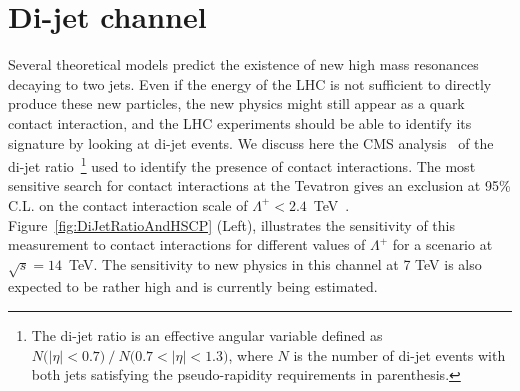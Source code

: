 \documentclass{PoS}
\begin{document}
\section{Di-jet channel} \label{dijet}
Several theoretical models predict the existence of new 
high mass resonances decaying to two jets.
Even if the energy of the LHC is not sufficient to directly produce 
these new particles, the new physics might still appear as 
a quark contact interaction,
and the LHC experiments should be able to identify its signature 
by looking at di-jet events.
We discuss here the CMS analysis~\cite{DIJETSNOTE}
of the di-jet ratio~\footnote{
The di-jet ratio is an effective angular variable
defined as $N\mbox{(}|\eta|<0.7\mbox{)}~/~N\mbox{(}0.7<|\eta|< 1.3 \mbox{)}$, 
where $N$ is the number of di-jet events with both jets satisfying the 
pseudo-rapidity requirements in parenthesis.} 
used to identify the presence of contact interactions. 
The most sensitive search for contact interactions at the Tevatron 
gives an exclusion at 95\% C.L. on the contact interaction scale 
of $\Lambda^{+} < 2.4$~TeV~\cite{Abbott:1998wh}.  
Figure~\ref{fig:DiJetRatioAndHSCP} (Left), illustrates the sensitivity of this measurement to 
contact interactions for different values of $\Lambda^{+}$ for a scenario at $\sqrt{s} = 14$~TeV.
The sensitivity to new physics in this channel at 7 TeV is also expected to be rather high and 
is currently being estimated.
\end{document}
